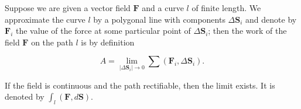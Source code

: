 Suppose we are given a vector field $\mathbf{F}$ and a curve $l$ of finite length. We approximate the curve $l$ by a polygonal line with components $\Delta \mathbf{S}_i$ and denote by $\mathbf{F}_i$ the value of the force at some particular point of $\Delta \mathbf{S}_i$; then the work of the field $\mathbf{F}$ on the path $l$ is by definition

$$A = \lim_{|\Delta \mathbf{S}_i| \to 0} \sum (\mathbf{F}_i, \Delta \mathbf{S}_i).$$

If the field is continuous and the path rectifiable, then the limit exists. It is denoted by $\int_l (\mathbf{F}, d\mathbf{S})$.
